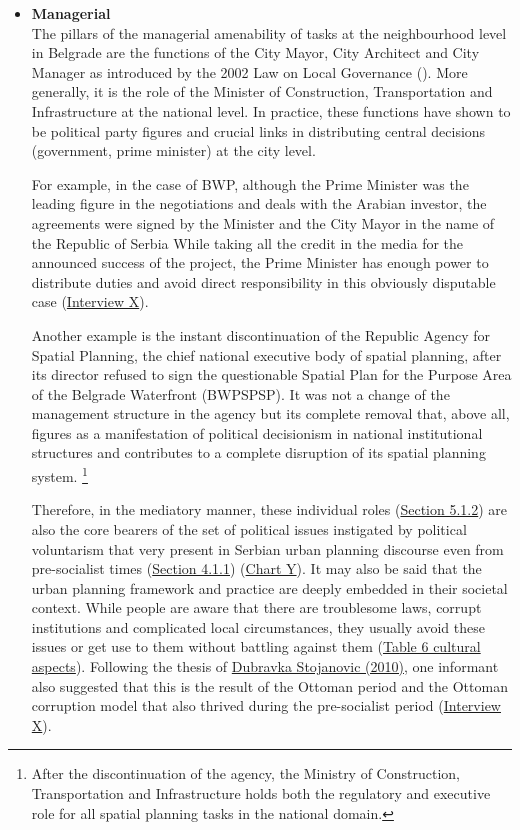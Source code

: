 \documentclass[11pt]{report}
\begin{document}
\begin{itemize}
\item \textbf{Managerial}
\\
The pillars of the managerial amenability of tasks at the neighbourhood level in Belgrade are the functions of the City Mayor, City Architect and City Manager as introduced by the 2002 Law on Local Governance (\href{Vujovic}{\citealt{vujovic_belgrades_2007}}).
More generally, it is the role of the Minister of Construction, Transportation and Infrastructure at the national level.
In practice, these functions have shown to be political party figures and crucial links in distributing central decisions (government, prime minister) at the city level.

For example, in the case of BWP, although the Prime Minister was the leading figure in the negotiations and deals with the Arabian investor, the agreements were signed by the Minister and the City Mayor in the name of the Republic of Serbia
While taking all the credit in the media for the announced success of the project, the Prime Minister has enough power to distribute duties and avoid direct responsibility in this obviously disputable case (\href{InterviewX}{Interview X}).

Another example is the instant discontinuation of the Republic Agency for Spatial Planning, the chief national executive body of spatial planning, after its director refused to sign the questionable Spatial Plan for the Purpose Area of the Belgrade Waterfront (BWPSPSP). It was not a change of the management structure in the agency but its complete removal that, above all, figures as a manifestation of political decisionism in national institutional structures and contributes to a complete disruption of its spatial planning system.
\footnote{After the discontinuation of the agency, the Ministry of Construction, Transportation and Infrastructure holds both the regulatory and executive role for all spatial planning tasks in the national domain.}

Therefore, in the mediatory manner, these individual roles (\href{Section 5.1.2}{Section 5.1.2}) are also the core bearers of the set of political issues instigated by political voluntarism  that very present in Serbian urban planning discourse even from pre-socialist times (\href{Section 4.1.1}{Section 4.1.1}) (\href{Table 6 social aspects}{Chart Y}).
It may also be said that the urban planning framework and practice are deeply embedded in their societal context. While people are aware that there are troublesome laws, corrupt institutions and complicated local circumstances, they usually avoid these issues or get use to them without battling against them (\href{ref}{Table 6 cultural aspects}).
Following the thesis of \href{Stojanovic}{Dubravka Stojanovic (2010)},
one informant also suggested that this is the result of the Ottoman period and the Ottoman corruption model that also thrived during the pre-socialist period (\href{InterviewX}{Interview X}).
\\


\end{itemize}
\end{document}
